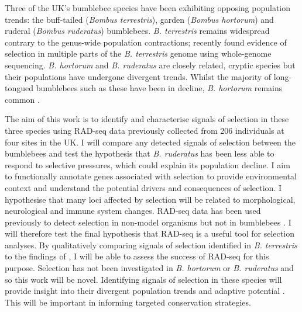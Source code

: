 \documentclass[12pt]{article}
\begin{document}
\begin{linenumbers}
	
	Three of the UK's bumblebee species have been exhibiting opposing population trends: the buff-tailed (\emph{Bombus terrestris}), garden (\emph{Bombus hortorum}) and ruderal (\emph{Bombus ruderatus}) bumblebees. 
	\emph{B. terrestris} remains widespread contrary to the genus-wide population contractions; \cite{colgan_genomic_2022} recently found evidence of selection in multiple parts of the \emph{B. terrestris} genome using whole-genome sequencing. \emph{B. hortorum} and \emph{B. ruderatus} are closely related, cryptic species but their populations have undergone divergent trends. Whilst the majority of long-tongued bumblebees such as these have been in decline, \emph{B. hortorum} remains common \citep{ellis_delineating_2005, wood_targeted_2015, maebe_microsatellite_2015}. 


	The aim of this work is to identify and characterise signals of selection in these three species using RAD-seq data previously collected from 206 individuals at four sites in the UK. 
	I will compare any detected signals of selection between the bumblebees and test the hypothesis that \emph{B. ruderatus} has been less able to respond to selective pressures, which could explain its population decline.
	I aim to functionally annotate genes associated with selection to provide environmental context and understand the potential drivers and consequences of selection. I hypothesise that many loci affected by selection will be related to morphological, neurological and immune system changes. 
	RAD-seq data has been used previously to detect selection in non-model organisms but not in bumblebees \citep[e.g.][]{blanco-bercial_new_2016, kang_population_2017, leiva_population_2019, de_jong_detecting_2021}. I will therefore test the final hypothesis that RAD-seq is a useful tool for selection analyses. By qualitatively comparing signals of selection identified in \emph{B. terrestris} to the findings of \cite{colgan_genomic_2022}, I will be able to assess the success of RAD-seq for this purpose. Selection has not been investigated in \emph{B. hortorum} or \emph{B. ruderatus} and so this work will be novel.
	Identifying signals of selection in these species will provide insight into their divergent population trends and adaptive potential \citep{woodard_molecular_2015, powney_widespread_2019}. This will be important in informing targeted conservation strategies. 
	

\end{linenumbers}
\end{document}
